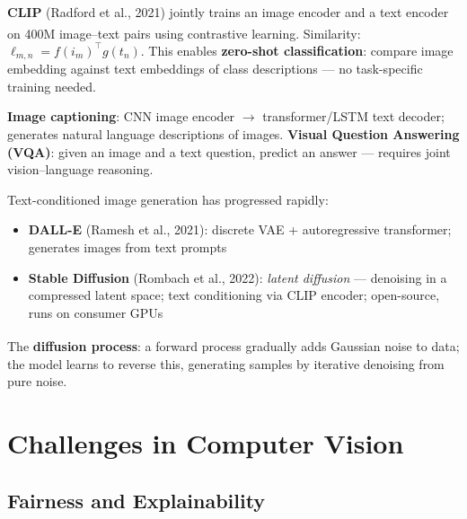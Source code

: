 \begin{tcbitemize}[ skin=sectionraster ]
    \tcbitem[title={CLIP and Zero-Shot Vision}, raster multicolumn=3]
    \textbf{CLIP} (Radford et al., 2021) jointly trains an image encoder and a text encoder on 400M image--text pairs using contrastive learning\textsuperscript{\cite[][pp.~115--117]{fleuretLittleBookDeep}}.
    Similarity: $\ell_{m,n} = f(i_m)^\top g(t_n)$.
    This enables \textbf{zero-shot classification}: compare image embedding against text embeddings of class descriptions --- no task-specific training needed.

    \tcbitem[title={Image Captioning and VQA}, raster multicolumn=3]
    \textbf{Image captioning}: CNN image encoder $\to$ transformer/LSTM text decoder; generates natural language descriptions of images.
    \textbf{Visual Question Answering (VQA)}: given an image and a text question, predict an answer --- requires joint vision--language reasoning.

    \tcbitem[title={Text-to-Image Generation}, raster multicolumn=6]
    Text-conditioned image generation has progressed rapidly:
    \begin{itemize}
        \item \textbf{DALL-E} (Ramesh et al., 2021): discrete VAE + autoregressive transformer; generates images from text prompts
        \item \textbf{Stable Diffusion} (Rombach et al., 2022): \emph{latent diffusion} --- denoising in a compressed latent space; text conditioning via CLIP encoder; open-source, runs on consumer GPUs
    \end{itemize}
    The \textbf{diffusion process}\textsuperscript{\cite[][pp.~121--123]{fleuretLittleBookDeep}}: a forward process gradually adds Gaussian noise to data; the model learns to reverse this, generating samples by iterative denoising from pure noise.
\end{tcbitemize}


\section{Challenges in Computer Vision}

\subsection{Fairness and Explainability}


